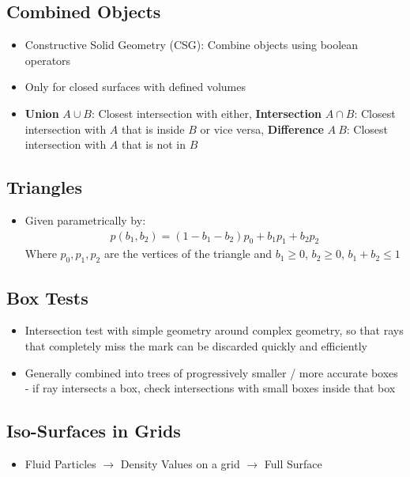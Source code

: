 \documentclass{scrartcl}
\begin{document}
\subsection*{Combined Objects}
\begin{itemize}
    \item Constructive Solid Geometry (CSG): Combine objects using boolean operators
    \item Only for closed surfaces with defined volumes
    \item \textbf{Union} $A \cup B$: Closest intersection with either, \textbf{Intersection} $A \cap B$: Closest intersection with $A$ that is inside $B$ or vice versa, \textbf{Difference} $A \ B$: Closest intersection with $A$ that is not in $B$
\end{itemize}
\subsection*{Triangles}
\begin{itemize}
    \item Given parametrically by:
    \begin{align*}
        p(b_1, b_2) = (1-b_1-b_2)p_0 + b_1 p_1 + b_2 p_2
    \end{align*}
    Where $p_0, p_1, p_2$ are the vertices of the triangle and $b_1 \geq 0$, $b_2 \geq 0$, $b_1 + b_2 \leq 1$
\end{itemize}
\subsection*{Box Tests}
\begin{itemize}
    \item Intersection test with simple geometry around complex geometry, so that rays that completely miss the mark can be discarded quickly and efficiently
    \item Generally combined into trees of progressively smaller / more accurate boxes - if ray intersects a box, check intersections with small boxes inside that box
\end{itemize}
\subsection*{Iso-Surfaces in Grids}
\begin{itemize}
    \item Fluid Particles $\to$ Density Values on a grid $\to$ Full Surface
\end{itemize}
\end{document}
